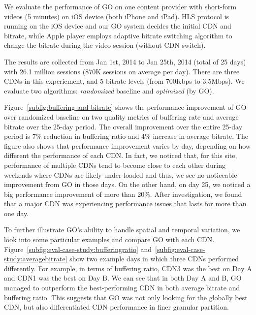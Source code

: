 \label{subsec:eval_setup}

We evaluate the performance of GO on one content provider with short-form videos (5 minutes) on iOS device (both iPhone and iPad). 
HLS protocol is running on the iOS device and our GO system decides the initial CDN and bitrate, while Apple player employs adaptive 
bitrate switching algorithm to change the bitrate during the video session (without CDN switch). 

The results are collected from Jan 1st, 2014 to Jan 25th, 2014 (total of 25 days) with 26.1 million sessions (870K sessions on average per day).
There are three CDNs in this experiement, and 5 bitrate levels (from 700Kbps to 3.5Mbps). We evaluate two algorithms: {\it randomized} baseline and {\it optimized} (by GO).


\label{subsec:real-world-improvement}

Figure~\ref{subfig:buffering-and-bitrate} shows the performance improvement of GO over randomized baseline on two quality metrics of
buffering rate and average bitrate over the 25-day period. The overall improvement over the entire 25-day period is 7\% reduction in buffering ratio and 4\% increase in 
average bitrate. The figure also shows that performance improvement varies by day, depending on how different the performance of each CDN. 
In fact, we noticed that, for this site, performance of multiple CDNs tend to become close to each other
during weekends where CDNs are likely under-loaded and thus, we see no noticeable improvement from GO in those days. 
On the other hand, on day 25, we noticed a big performance improvement of more than 20\%. After investigation,
we found that a major CDN was experiencing performance issues that lasts for more than one day. 

To further illustrate GO's ability to handle spatial and temporal variation, 
we look into some particular examples and compare GO with each CDN. Figure~\ref{subfig:eval-case-study:bufferingratio} and~\ref{subfig:eval-case-study:averagebitrate} show two example days in which three CDNs performed differently.  For example, in terms of buffering ratio, CDN3 was the best on Day A and CDN1 was the best on Day B. 
We can see that in both Day A and B, GO managed to outperform the best-performing CDN in both average bitrate 
and buffering ratio. This suggests that GO was not only looking for the globally best CDN, but also 
differentiated CDN performance in finer granular partition.

